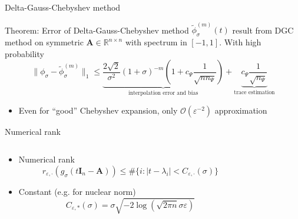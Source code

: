 \documentclass[aspectratio=169, leqno, 12pt]{beamer}
\newcommand{\mtx}[1]{\boldsymbol{#1}}
\begin{document}
\begin{frame}{Delta-Gauss-Chebyshev method}
    \begin{block}{Theorem: Error of Delta-Gauss-Chebyshev method}
        $\widetilde{\phi}_{\sigma}^{(m)}(t)$ result from \gls{DGC} method
        on symmetric $\mtx{A} \in \mathbb{R}^{n \times n}$ with spectrum in $[-1, 1]$.
        With high probability
        \begin{equation}
            \lVert \phi_{\sigma} - \widetilde{\phi}_{\sigma}^{(m)}\rVert _1
            \leq \underbrace{ \frac{2\sqrt{2}}{\sigma^2} (1 + \sigma)^{-m} \left( 1 + c_{\Psi} \frac{1}{\sqrt{n n_{\Psi}}} \right)}_{\text{interpolation error and bias}} + \underbrace{c_{\Psi} \frac{1}{\sqrt{n_{\Psi}}}}_{\text{trace estimation}}
        \end{equation}
    \end{block}
    \begin{itemize}
        \item Even for \enquote{good} Chebyshev expansion, only $\mathcal{O}(\varepsilon^{-2})$ approximation
    \end{itemize}
\end{frame}

\begin{frame}{Numerical rank}
    \begin{columns}
        \begin{column}{0.55\textwidth}
            \begin{itemize}
            \item Numerical rank
            \begin{equation}
                r_{\varepsilon, \cdot}(g_{\sigma}(t\mtx{I}_n - \mtx{A})) \leq \#\{i: |t - \lambda_i| < C_{\varepsilon, \cdot}(\sigma)\}
            \end{equation}
            \item Constant (e.g. for nuclear norm)
            \begin{equation}
                C_{\varepsilon, \ast}(\sigma) = \sigma \sqrt{-2 \log(\sqrt{2 \pi n} \sigma \varepsilon)}
            \end{equation}
            \end{itemize}
        \end{column}
        \begin{column}{0.45\textwidth}
            \scalebox{0.6}{}
        \end{column}
    \end{columns}
    \centering
    \scalebox{1.0}{}
\end{frame}
\end{document}
